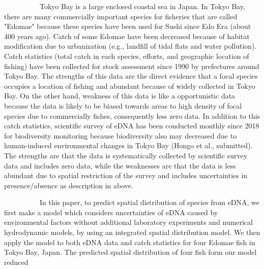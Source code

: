 \documentclass[12pt]{article}
\begin{document}
\begin{linenumbers}
\ \ \ \ \ \ \ \ \ \ 
Tokyo Bay is a large enclosed coastal sea in Japan. In Tokyo Bay, there are many commercially important species for fisheries that are called "Edomae" because these species have been used for Sushi since Edo Era (about 400 years ago). Catch of some Edomae have been decreased because of habitat modification due to urbanization (e.g., landfill of tidal flats and water pollution). Catch statistics (total catch in each species, efforts, and geographic location of fishing) have been collected for stock assessment since 1990 by prefectures around Tokyo Bay. The strengths of this data are the direct evidence that a focal species occupies a location of fishing and abundant because of widely collected in Tokyo Bay.  On the other hand, weakness of this data is like a opportunistic data because the data is likely to be biased towards areas to high density of focal species due to commercially fishes, consequently less zero data. In addition to this catch statistics, scientific survey of eDNA has been conducted monthly since 2018 for biodiversity monitoring because biodiversity also may decreased due to human-induced environmental changes in Tokyo Bay (Hongo et al., submitted). The strengths are that the data is systematically collected by scientific survey data and includes zero data, while the weaknesses are that the data is less abundant due to spatial restriction of the survey and includes uncertainties in presence/absence as description in above.


\ \ \ \ \ \ \ \ \ \ 
In this paper, to predict spatial distribution of species from eDNA, we first make a model which considers uncertainties of eDNA caused by environmental factors without additional laboratory experiments and numerical hydrodynamic models, by using an integrated spatial distribution model. We then apply the model to both eDNA data and catch statistics for four Edomae fish in Tokyo Bay, Japan. 
The predicted spatial distribution of four fish form our model reduced 




\end{linenumbers}
\end{document}
